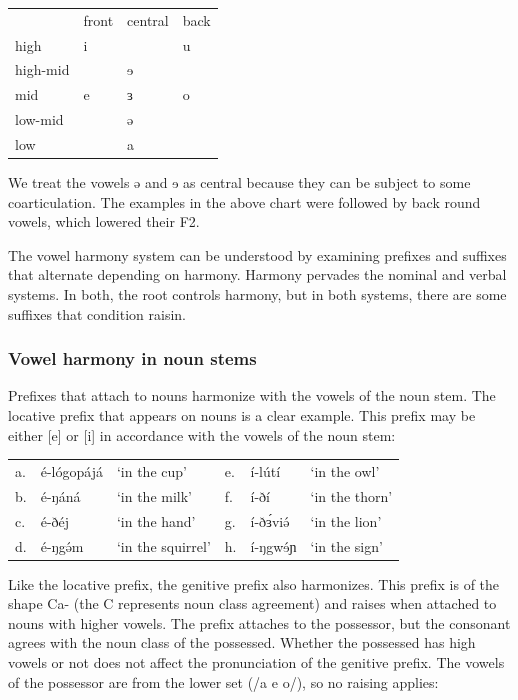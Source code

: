 \ea
\begin{tabular}[t]{llll}
&	front	&	central	&	back\\
high	&	i	&	&	u\\
high-mid	&	&	ɘ\\
mid 	&	e	&	ɜ	&	o\\
low-mid	&	&	ə\\
low	&	&	a\\
\end{tabular}
\z

We treat the vowels ə and ɘ as central because they can be subject to some coarticulation. The examples in the above chart were followed by back round vowels, which lowered their F2. 

The vowel harmony system can be understood by examining prefixes and suffixes that alternate depending on harmony. Harmony pervades the nominal and verbal systems. In both, the root controls harmony, but in both systems, there are some suffixes that condition raisin.

\subsubsection{Vowel harmony in noun stems}
Prefixes that attach to nouns harmonize with the vowels of the noun stem. The locative prefix that appears on nouns is a clear example. This prefix may be either [e] or [i] in accordance with the vowels of the noun stem:

\ea
\begin{tabular}[t]{llllll}
	a.&	é-lógopájá	&	‘in the cup’			&	e.&	í-lútí	&	‘in the owl’\\
	b.&	é-ŋáná		&	‘in the milk’		&	f.&	í-ðí	&	‘in the thorn’\\
	c.&	é-ðéj		&	‘in the hand’		&	g.&	í-ðɜ́viə́	&	‘in the lion’\\
	d.&	é-ŋgə́m 		&	‘in the squirrel’	&	h.&	í-ŋgwɘ́ɲ	&	‘in the sign’ \\
\end{tabular}
\z

Like the locative prefix, the genitive prefix also harmonizes. This prefix is of the shape Ca- (the C represents noun class agreement) and raises when attached to nouns with higher vowels. The prefix attaches to the possessor, but the consonant agrees with the noun class of the possessed. Whether the possessed has high vowels or not does not affect the pronunciation of the genitive prefix. The vowels of the possessor are from the lower set (/a e o/), so no raising applies:

